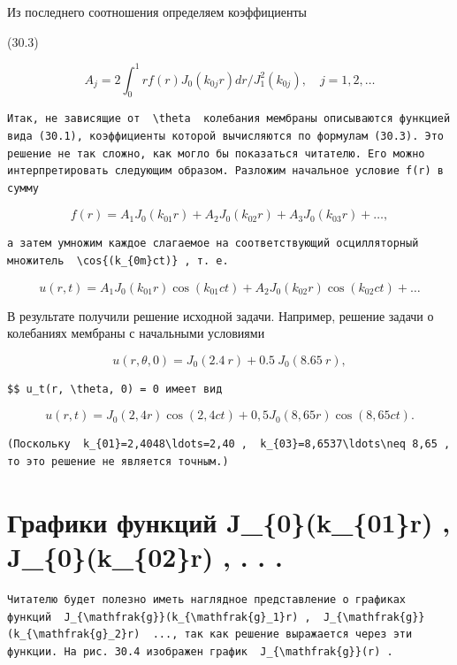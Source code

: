 \documentclass[
  ukrainian,
]{article}
\begin{document}
Из последнего соотношения определяем коэффициенты

(30.3)

\[
A_{j} = 2 \int_{0}^{1} r f(r) J_{0}(k_{0j}r) dr / J_{1}^{2}(k_{0j}), \quad j = 1, 2, \dots
\]

\begin{verbatim}
Итак, не зависящие от  \theta  колебания мембраны описываются функцией вида (30.1), коэффициенты которой вычисляются по формулам (30.3). Это решение не так сложно, как могло бы показаться читателю. Его можно интерпретировать следующим образом. Разложим начальное условие f(r) в сумму
\end{verbatim}

\[
f(r) = A_1 J_0(k_{01}r) + A_2 J_0(k_{02}r) + A_3 J_0(k_{03}r) + \dots,
\]

\begin{verbatim}
а затем умножим каждое слагаемое на соответствующий осцилляторный множитель  \cos{(k_{0m}ct)} , т. е.
\end{verbatim}

\[
u(r, t) = A_1 J_0(k_{01}r) \cos(k_{01}ct) + A_2 J_0(k_{02}r) \cos(k_{02}ct) + \dots
\]

В результате получили решение исходной задачи. Например, решение задачи
о колебаниях мембраны с начальными условиями

\[
u(r, \theta, 0) = J_0(2.4 \ r) + 0.5 \ J_0(8.65 \ r),
\]

\begin{verbatim}
$$ u_t(r, \theta, 0) = 0 имеет вид
\end{verbatim}

\[
u(r, t) = J_0(2, 4 r) \cos(2, 4 ct) + 0,5 J_0(8,65 r) \cos(8,65 ct).
\]

\begin{verbatim}
(Поскольку  k_{01}=2,4048\ldots=2,40 ,  k_{03}=8,6537\ldots\neq 8,65 , то это решение не является точным.)
\end{verbatim}

\section{Графики функций J\_\{0\}(k\_\{01\}r) , J\_\{0\}(k\_\{02\}r) , .
.
.}\label{ux433ux440ux430ux444ux438ux43aux438-ux444ux443ux43dux43aux446ux438ux439-j_0k_01r-j_0k_02r-.-.-.}

\begin{verbatim}
Читателю будет полезно иметь наглядное представление о графиках функций  J_{\mathfrak{g}}(k_{\mathfrak{g}_1}r) ,  J_{\mathfrak{g}}(k_{\mathfrak{g}_2}r)  ..., так как решение выражается через эти функции. На рис. 30.4 изображен график  J_{\mathfrak{g}}(r) .
\end{verbatim}
\end{document}
